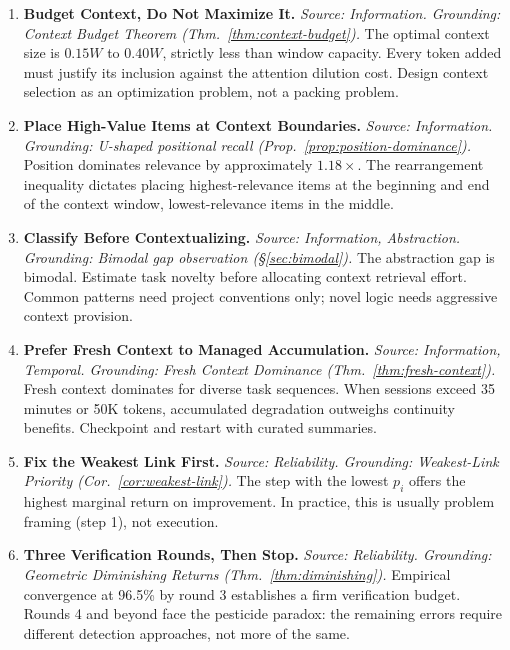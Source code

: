\documentclass[11pt, a4paper, logo, copyright]{googledeepmind}
\begin{document}
\begin{enumerate}[label=\textbf{P\arabic*.}, leftmargin=3em]

\item \textbf{Budget Context, Do Not Maximize It.}
\emph{Source: Information. Grounding: Context Budget Theorem (Thm.~\ref{thm:context-budget}).}
The optimal context size is $0.15W$ to $0.40W$, strictly less than window capacity. Every token added must justify its inclusion against the attention dilution cost. Design context selection as an optimization problem, not a packing problem.

\item \textbf{Place High-Value Items at Context Boundaries.}
\emph{Source: Information. Grounding: U-shaped positional recall (Prop.~\ref{prop:position-dominance}).}
Position dominates relevance by approximately $1.18\times$. The rearrangement inequality dictates placing highest-relevance items at the beginning and end of the context window, lowest-relevance items in the middle.

\item \textbf{Classify Before Contextualizing.}
\emph{Source: Information, Abstraction. Grounding: Bimodal gap observation (\S\ref{sec:bimodal}).}
The abstraction gap is bimodal. Estimate task novelty before allocating context retrieval effort. Common patterns need project conventions only; novel logic needs aggressive context provision.

\item \textbf{Prefer Fresh Context to Managed Accumulation.}
\emph{Source: Information, Temporal. Grounding: Fresh Context Dominance (Thm.~\ref{thm:fresh-context}).}
Fresh context dominates for diverse task sequences. When sessions exceed 35 minutes or 50K tokens, accumulated degradation outweighs continuity benefits. Checkpoint and restart with curated summaries.

\item \textbf{Fix the Weakest Link First.}
\emph{Source: Reliability. Grounding: Weakest-Link Priority (Cor.~\ref{cor:weakest-link}).}
The step with the lowest $p_i$ offers the highest marginal return on improvement. In practice, this is usually problem framing (step 1), not execution.

\item \textbf{Three Verification Rounds, Then Stop.}
\emph{Source: Reliability. Grounding: Geometric Diminishing Returns (Thm.~\ref{thm:diminishing}).}
Empirical convergence at 96.5\% by round 3 establishes a firm verification budget. Rounds 4 and beyond face the pesticide paradox: the remaining errors require different detection approaches, not more of the same.


\end{enumerate}
\end{document}
